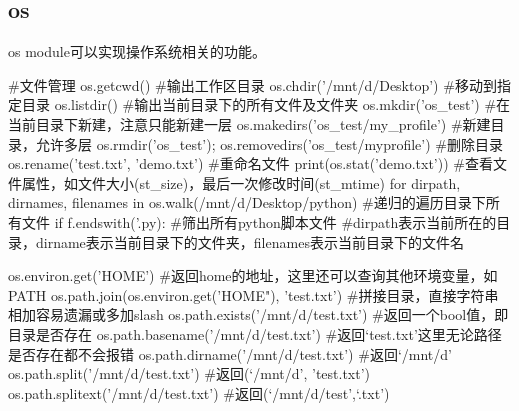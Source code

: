   \subsection{os}
    os module可以实现操作系统相关的功能。
    \begin{codeblock}[language=python, caption={os module}]
      #文件管理
      os.getcwd() #输出工作区目录
      os.chdir('/mnt/d/Desktop') #移动到指定目录
      os.listdir() #输出当前目录下的所有文件及文件夹
      os.mkdir('os_test') #在当前目录下新建，注意只能新建一层
      os.makedirs('os_test/my_profile') #新建目录，允许多层
      os.rmdir('os_test'); os.removedirs('os_test/myprofile') #删除目录
      os.rename('test.txt', 'demo.txt') #重命名文件
      print(os.stat('demo.txt')) #查看文件属性，如文件大小(st\_size)，最后一次修改时间(st\_mtime)
      for dirpath, dirnames, filenames in os.walk(/mnt/d/Desktop/python) #递归的遍历目录下所有文件
          if f.endswith('.py): #筛出所有python脚本文件
      #dirpath表示当前所在的目录，dirname表示当前目录下的文件夹，filenames表示当前目录下的文件名

      os.environ.get('HOME') #返回home的地址，这里还可以查询其他环境变量，如PATH
      os.path.join(os.environ.get('HOME"), 'test.txt') #拼接目录，直接字符串相加容易遗漏或多加slash
      os.path.exists('/mnt/d/test.txt') #返回一个bool值，即目录是否存在
      os.path.basename('/mnt/d/test.txt') #返回`test.txt'这里无论路径是否存在都不会报错
      os.path.dirname('/mnt/d/test.txt') #返回`/mnt/d'
      os.path.split('/mnt/d/test.txt') #返回(`/mnt/d', 'test.txt')
      os.path.splitext('/mnt/d/test.txt') #返回(`/mnt/d/test',`.txt')
    \end{codeblock}


